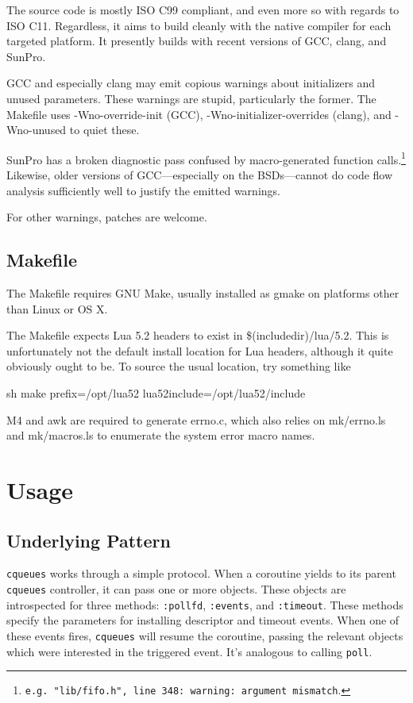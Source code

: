 \documentclass[11pt, oneside]{memoir}
\newcommand*{\cqueues}[0]{\texttt{cqueues}\xspace}
\newcommand*{\key}[1]{#1\index{#1}\xspace}
\newcommand*{\syscall}[1]{\texttt{#1}\xspace}
\newcommand*{\method}[1]{\texttt{#1}\xspace}
\begin{document}
The source code is mostly ISO C99 compliant, and even more so with regards to ISO C11. Regardless, it aims to build cleanly with the native compiler for each targeted platform. It presently builds with recent versions of GCC, clang, and SunPro.

GCC and especially clang may emit copious warnings about initializers and unused parameters. These warnings are stupid, particularly the former. The Makefile uses -Wno-override-init (GCC), -Wno-initializer-overrides (clang), and -Wno-unused to quiet these.

SunPro has a broken diagnostic pass confused by macro-generated function calls.\footnote{\texttt{e.g.\ "lib/fifo.h", line 348:\ warning:\ argument mismatch}.} Likewise, older versions of GCC---especially on the BSDs---cannot do code flow analysis sufficiently well to justify the emitted warnings.

For other warnings, patches are welcome.

\section{Makefile}

The Makefile requires GNU Make, usually installed as gmake on platforms other than Linux or OS X.

The Makefile expects Lua 5.2 headers to exist in \$(includedir)/lua/5.2. This is unfortunately not the default install location for Lua headers, although it quite obviously ought to be. To source the usual location, try something like

\begin{code}{sh}
        make prefix=/opt/lua52 lua52include=/opt/lua52/include
\end{code}

\key{M4} and \key{awk} are required to generate errno.c, which also relies on mk/errno.ls and mk/macros.ls to enumerate the system error macro names.

\chapter{Usage}

\section{Underlying Pattern}

\cqueues works through a simple protocol. When a coroutine yields to its parent \cqueues controller, it can pass one or more objects. These objects are introspected for three methods: \method{:pollfd}, \method{:events}, and \method{:timeout}. These methods specify the parameters for installing descriptor and timeout events. When one of these events fires, \cqueues will resume the coroutine, passing the relevant objects which were interested in the triggered event. It's analogous to calling \syscall{poll}.
\end{document}
